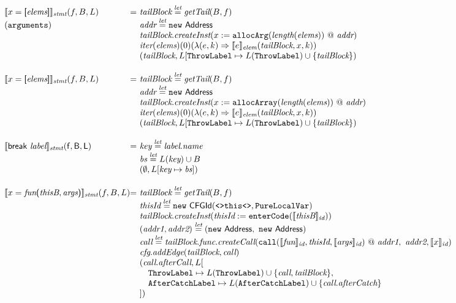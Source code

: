 \[\begin{array}{l@{}l@{~}l}
\transfun{\irarray{x}{\emph{elems}}}_{\emph{stmt}}(f, B, L)
& = & \emph{tailBlock} \letval \getTail(B, f)\\
(\TT{arguments}) & & \emph{addr} \letval \new\ \Address\\
& & \emph{tailBlock}.\emph{createInst}(x := \TT{allocArg}(\length(\emph{elems})) ~@~ \emph{addr})\\
& & \iter(\emph{elems})(0)(\lambda(e,k) \Rightarrow \transfun{e}_{\emph{elem}}(\emph{tailBlock}, x, k))\\
& & (\emph{tailBlock}, L[\ThrowLabel \mapsto L(\ThrowLabel) \cup \{ \emph{tailBlock} \})\\
& & \\

\transfun{\irarray{x}{\emph{elems}}}_{\emph{stmt}}(f, B, L)
& = & \emph{tailBlock} \letval \getTail(B, f)\\
& & \emph{addr} \letval \new\ \Address\\
& & \emph{tailBlock}.\emph{createInst}(x :=\TT{allocArray}(\length(\emph{elems})) ~@~ \emph{addr})\\
& & \iter(\emph{elems})(0)(\lambda(e,k) \Rightarrow \transfun{e}_{\emph{elem}}(\emph{tailBlock}, x, k))\\
& & (\emph{tailBlock}, L[\ThrowLabel \mapsto L(\ThrowLabel) \cup \{ \emph{tailBlock} \})\\
& & \\

\transfun{\sf{break}\ \emph{label}}_{\emph{stmt}}(f, B, L)
& = & \emph{key} \letval \emph{label}.\emph{name}\\
& & \emph{bs} \letval L(\emph{key}) \cup B\\
& & (\emptyset, L[\emph{key} \mapsto \emph{bs}])\\
& & \\


\transfun{\ircfgcall{x}{\emph{fun}}{\emph{thisB}, \emph{args}}}_{\emph{stmt}}(f, B, L)
& = & \emph{tailBlock} \letval \getTail(B, f)\\
& & \emph{thisId} \letval \new\ \CFGId(\TT{<>this<>}, \TT{PureLocalVar})\\
& & \emph{tailBlock}.\emph{createInst}(\emph{thisId} := \TT{enterCode}(\transfun{\emph{thisB}}_{\emph{id}}))\\
& & (\emph{addr1}, \emph{addr2}) \letval (\new\ \Address,\ \new\ \Address)\\
& & \emph{call} \letval \emph{tailBlock}.\emph{func}.\emph{createCall}(\TT{call}(\transfun{\emph{fun}}_{\emph{id}}, \emph{thisId}, \transfun{\emph{args}}_{\emph{id}}) ~@~ \emph{addr1},\ \emph{addr2}, \transfun{x}_{\emph{id}})\\
& & \emph{cfg}.\emph{addEdge}(\emph{tailBlock}, \emph{call})\\
& & (\emph{call}.\emph{afterCall}, L[\\
& & \quad \ThrowLabel \mapsto L(\ThrowLabel) \cup \{ \emph{call}, \emph{tailBlock} \},\\
& & \quad \AfterCatchLabel \mapsto L(\AfterCatchLabel) \cup \{ \emph{call}.\emph{afterCatch} \}\\
& & ])\\
\end{array}
\]
